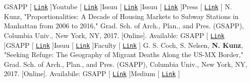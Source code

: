 \documentclass{article}
\begin{document}
        \faTrain\space GSAPP [ \href{https://www.arch.columbia.edu/courses/87029-1878-genoa-italy-negotiating-fragments}{\texttt{Link}} ]\space\faYoutube\space Youtube [ \href{https://www.youtube.com/watch?v=NaVhil1sQfY}{\texttt{Link}} ]\space\faBook\space Issuu [ \href{https://issuu.com/nickkunz/docs/geotagged_genoa}{\texttt{Link}} ]\space\faBook\space Issuu [ \href{https://issuu.com/nickkunz/docs/quarto}{\texttt{Link}} ]\space\faNewspaper\space Press [ \href{http://www.comune.genova.it/content/restructuring-quarto-workshop-le-idee-degli-studenti-della-columbia-university-l39ex-op}{\texttt{Link}} ]\newline\newline
        N. Kunz, "Proportionalities: A Decade of Housing Markets to Subway Stations in Manhattan from 2006 to 2016," Grad. Sch. of Arch., Plan., and Pres. (GSAPP), Columbia Univ., New York, NY, 2017. [Online]. Available:\newline\newline
        \faTrain\space GSAPP [ \href{https://www.arch.columbia.edu/student-work/4836}{\texttt{Link}} ]\space\faTrain\space GSAPP [ \href{https://www.arch.columbia.edu/student-work/4835}{\texttt{Link}} ]\space\faBook\space Issuu [ \href{https://issuu.com/nickkunz/docs/gis}{\texttt{Link}} ]\space\faCertificate\space Faculty [ \href{https://www.leahmeisterlin.com/teaching#/gis-2017-2018/}{\texttt{Link}} ]\newline\newline
        G. S. Coch, S. Nelsen, \textbf{N. Kunz}, "Seeking Refuge: The Geography of Migrant Deaths Along the US-MX Border," Grad. Sch. of Arch., Plan., and Pres. (GSAPP), Columbia Univ., New York, NY, 2017. [Online]. Availabile:\newline\newline
        \faTrain\space GSAPP [ \href{https://www.arch.columbia.edu/student-work/4895}{\texttt{Link}} ]\space\faMedium\space Medium [ \href{https://medium.com/data-mining-the-city/seeking-refuge-the-geography-of-migrant-deaths-near-the-us-mx-border-b0f8f8be84ec}{\texttt{Link}} ]\newline\newline
\end{document}
